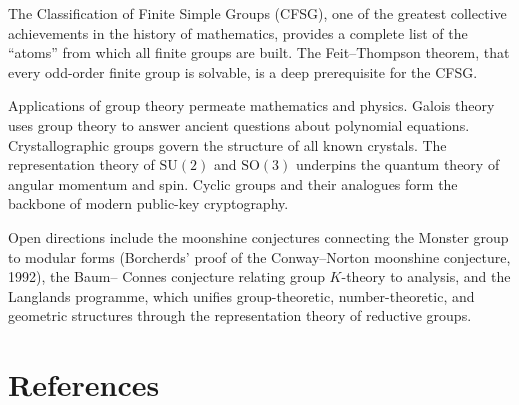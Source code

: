 \documentclass[12pt,a4paper]{amsart}
\theoremstyle{definition}
\begin{document}
The Classification of Finite Simple Groups (CFSG), one of the greatest collective
achievements in the history of mathematics, provides a complete list of the
``atoms'' from which all finite groups are built. The Feit--Thompson theorem, that
every odd-order finite group is solvable, is a deep prerequisite for the CFSG.

Applications of group theory permeate mathematics and physics. Galois theory uses group
theory to answer ancient questions about polynomial equations. Crystallographic groups
govern the structure of all known crystals. The representation theory of $\mathrm{SU}(2)$
and $\mathrm{SO}(3)$ underpins the quantum theory of angular momentum and spin. Cyclic
groups and their analogues form the backbone of modern public-key cryptography.

Open directions include the moonshine conjectures connecting the Monster group to modular
forms (Borcherds' proof of the Conway--Norton moonshine conjecture, 1992), the Baum--
Connes conjecture relating group $K$-theory to analysis, and the Langlands programme,
which unifies group-theoretic, number-theoretic, and geometric structures through the
representation theory of reductive groups.

\section*{References}
\end{document}

